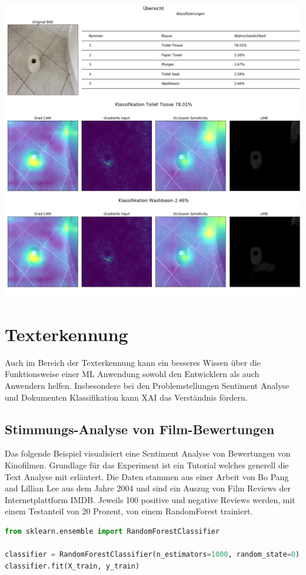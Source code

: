 \documentclass[
  12pt, %
  a4paper, %
  oneside, %
  openany, 
  numbers=noenddot, %
  BCOR=5mm, %
  parskip=half*, %
  thesis, %
]{bfhbook}
\begin{document}
\includegraphics[width=\textwidth]{Bilder/Toilett-Tissue-Classification.png}

\section{Texterkennung}
Auch im Bereich der Texterkennung kann ein besseres Wissen über die Funktionsweise einer \Gls{ML} Anwendung sowohl den Entwicklern als auch Anwendern helfen. Insbesondere bei den Problemstellungen Sentiment Analyse und Dokumenten Klassifikation kann \Gls{XAI} das Verständnis fördern.

\subsection{Stimmungs-Analyse von Film-Bewertungen}
Das folgende Beispiel visualisiert eine Sentiment Analyse von Bewertungen von Kinofilmen. Grundlage für das Experiment ist ein Tutorial \cite{movieReview} welches generell die Text Analyse mit \cite{scikit-learn} erläutert. Die Daten stammen aus einer Arbeit von Bo Pang and Lillian Lee \parencite{Pang+Lee2004} aus dem Jahre 2004 und sind ein Auszug von Film Reviews der Internetplattform IMDB. Jeweils 100 positive und negative Reviews werden, mit einem Testanteil von 20 Prozent, von einem RandomForest trainiert.

\begin{lstlisting}[language=Python]
from sklearn.ensemble import RandomForestClassifier

classifier = RandomForestClassifier(n_estimators=1000, random_state=0)
classifier.fit(X_train, y_train)
\end{lstlisting}
\end{document}
